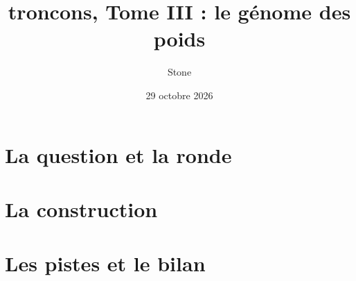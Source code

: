 \documentclass[11pt, a4paper, twoside, openright, parskip=false, headings=big,
               chapterprefix=true, numbers=noenddot, bibliography=totoc,
               listof=totoc]{scrbook}
\title{troncons, Tome III : le génome des poids}
\author{Stone}
\date{29 octobre 2026}
\newcommand{\Racine}{../..}               %
\begin{document}
\frontmatter


\tableofcontents
\listoffigures
\listoftables
\lstlistoflistings


\mainmatter


\part{La question et la ronde}








\part{La construction}




\part{Les pistes et le bilan}




\appendix




\backmatter

\end{document}
